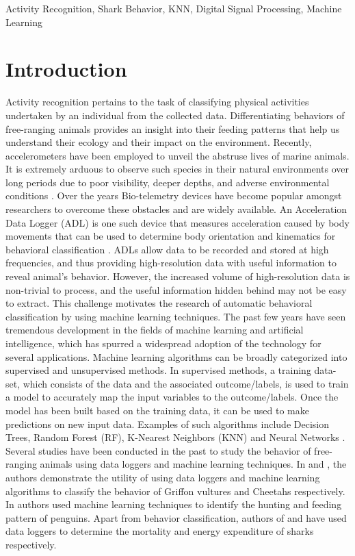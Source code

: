\documentclass[conference]{IEEEtran}
\begin{document}
\begin{IEEEkeywords}
Activity Recognition, Shark Behavior, KNN, Digital Signal Processing, Machine Learning
\end{IEEEkeywords}

\section{Introduction}
Activity recognition pertains to the task of classifying physical activities undertaken by an individual from the collected data. Differentiating behaviors of free-ranging animals provides an insight into their feeding patterns that help us understand their ecology and their impact on the environment. Recently, accelerometers have been employed to unveil the abstruse lives of marine animals.   It is extremely arduous to observe such species in their natural environments over long periods due to poor visibility, deeper depths, and adverse environmental conditions \cite{1}. Over the years Bio-telemetry devices have become popular amongst researchers to overcome these obstacles and are widely available. An Acceleration Data Logger (ADL) is one such device that measures acceleration caused by body movements that can be used to determine body orientation and kinematics for behavioral classification \cite{1}. ADLs allow data to be recorded and stored at high frequencies, and thus providing high-resolution data with useful information to reveal animal’s behavior. However, the increased   volume of high-resolution data is non-trivial to process, and the useful information hidden behind may not be easy to extract. This challenge motivates the research of automatic behavioral classification by using machine learning techniques. 
The past few years have seen tremendous development in the fields of machine learning and artificial intelligence, which has spurred a widespread adoption of the technology for several applications. Machine learning algorithms can be broadly categorized into supervised and unsupervised methods. In supervised methods, a training data-set, which consists of the data and the associated outcome/labels, is used to train a model to accurately map the input variables to the outcome/labels. Once the model has been built based on the training data, it can be used to make predictions on new input data. Examples of such algorithms include Decision Trees, Random Forest (RF), K-Nearest Neighbors (KNN) and Neural Networks \cite{1}. 
Several studies have been conducted in the past to study the behavior of free-ranging animals using data loggers and machine learning techniques. In  \cite{2} and  \cite{3}, the authors demonstrate the utility of using data loggers and machine learning algorithms to classify the behavior of Griffon vultures and Cheetahs respectively. In  \cite{4} authors used machine learning techniques to identify the hunting and feeding pattern of penguins. Apart from behavior classification, authors of  \cite{5} and  \cite{6} have used data loggers to determine the mortality and energy expenditure of sharks respectively.
\end{document}
